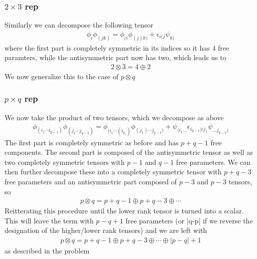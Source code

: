 \documentclass[a4paper,12pt]{article}
\begin{document}
\subsubsection*{$2\times 3 $ rep}
Similarly we can decompose the following tensor
\begin{equation}
	\begin{aligned}
		\phi_i\phi_{(jk)}=\phi_{(i}\phi_{(j)k)}+\epsilon_{i(j}\psi_{k)}
	\end{aligned}
\end{equation}
where the first part is completely symmetric in its indices so it has 4 free paramters, while the antisymmetric part now has two, which leads us to
\begin{equation}
	\begin{aligned}
		2\otimes 3 = 4\oplus 2
	\end{aligned}
\end{equation}
We now generalize this to the case of $p\otimes q$
\subsubsection*{$p\times q $ rep}
We now take the product of two tensors, which we decompose as above
\begin{equation}
	\begin{aligned}
		\phi_{(i_1\cdots i_{p-1})}\phi_{(j_1\cdots j_{q-1})}=\phi_{(i_1\cdots(i_{p_1})}\phi_{(j_1)\cdots j_{q-1})}+\psi_{(i_1\dots }\epsilon_{i_{q-1})(j_1}\psi_{\dots j_{q-1})}
	\end{aligned}
\end{equation}
The first part is completely symmetric as before and has $p+q-1$ free components. The second part is composed of the antisymmetric tensor as well as two completely symmetric tensors with $p-1$ and $q-1$ free parameters. We can then further decompose these into a completely symmetric tensor with $p+q-3$ free parameters and an antisymmetric part composed of $p-3$ and $p-3$ tensors, so
\begin{equation}
	\begin{aligned}
		p\otimes q=p+q-1\oplus p+q-3\oplus \cdots
	\end{aligned}
\end{equation}
Reitterating this procedure until the lower rank tensor is turned into a scalar. This will leave the term with $p-q+1$ free parameters (or |q-p| if we reverse the designation of the higher/lower rank tensors) and we are left with
\begin{equation}
	\begin{aligned}
		p\otimes q=p+q-1\oplus p+q-3\oplus \cdots \oplus |p-q|+1
	\end{aligned}
\end{equation}
as described in the problem
\end{document}
